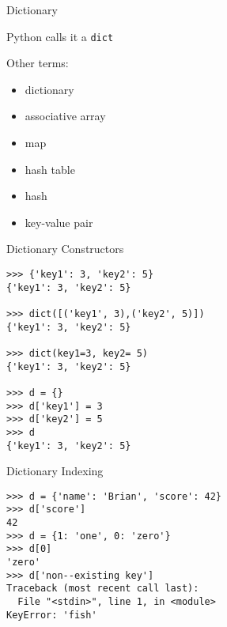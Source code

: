 \documentclass{beamer}
\begin{document}
\begin{frame}[fragile]{Dictionary}

{\Large Python calls it a \verb|dict| }

\vfill
{\Large Other terms:}
\begin{itemize}
  \item dictionary
  \item associative array
  \item map
  \item hash table
  \item hash
  \item key-value pair
\end{itemize}

\vfill

\end{frame} 

\begin{frame}[fragile]{Dictionary Constructors}

\begin{verbatim}
>>> {'key1': 3, 'key2': 5}
{'key1': 3, 'key2': 5}

>>> dict([('key1', 3),('key2', 5)])
{'key1': 3, 'key2': 5}

>>> dict(key1=3, key2= 5)
{'key1': 3, 'key2': 5}

>>> d = {}
>>> d['key1'] = 3
>>> d['key2'] = 5
>>> d
{'key1': 3, 'key2': 5}
\end{verbatim}

\end{frame} 

\begin{frame}[fragile]{Dictionary Indexing}

\begin{verbatim}
>>> d = {'name': 'Brian', 'score': 42}
>>> d['score']
42
>>> d = {1: 'one', 0: 'zero'}
>>> d[0]
'zero'
>>> d['non-­‐existing key']
Traceback (most recent call last):
  File "<stdin>", line 1, in <module>
KeyError: 'fish'
\end{verbatim}

\end{frame} 
\end{document}
